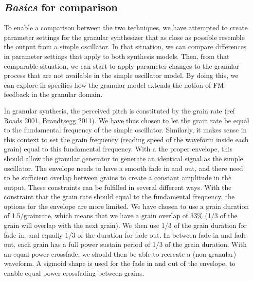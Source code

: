 \documentclass[runningheads,a4paper]{llncs}
\begin{document}
\subsection{\emph{Basics} for comparison}
To enable a comparison between the two techniques, we have attempted to create parameter settings for the granular synthesizer that as close as possible resemble the output from a simple oscillator. In that situation, we can compare differences in parameter settings that apply to both synthesis models. Then, from that comparable situation, we can start to apply parameter changes to the granular process that are not available in the simple oscillator model. By doing this, we can explore in specifics how the granular model extends the notion of FM feedback in the granular domain.

In granular synthesis, the perceived pitch is constituted by the grain rate (ref Roads 2001, Brandtsegg 2011). We have thus chosen to let the grain rate be equal to the fundamental frequency of the simple oscillator. Similarly, it makes sense in this context to set the grain frequency (reading speed of the waveform inside each grain) equal to this fundamental frequency. With a the proper envelope, this should allow the granular generator to generate an identical signal as the simple oscillator. The envelope needs to have a smooth fade in and out, and there need to be sufficient overlap between grains to create a constant amplitude in the output. These constraints can be fulfilled in several different ways. With the constraint that the grain rate should equal to the fundamental frequency, the options for the envelope are more limited. We have chosen to use a grain duration of 1.5/grainrate, which means that we have a grain overlap of 33\% (1/3 of the grain will overlap with the next grain). We then use 1/3 of the grain duration for fade in, and equally 1/3 of the duration for fade out. In between fade in and fade out, each grain has a full power sustain period of 1/3 of the grain duration. With an equal power crossfade, we should then be able to recreate a (non granular) waveform. A sigmoid shape is used for the fade in and out of the envelope, to enable equal power crossfading between grains. 
\end{document}

